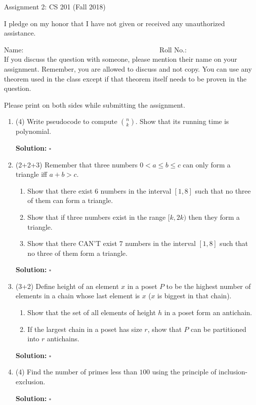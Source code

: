 \documentclass[10pt]{letter}
\newenvironment{solution}{\textbf{Solution:}}{\hfill$\square$}
\begin{document}
\begin{center}
Assignment 2: CS 201 (Fall 2018)
\end{center}

I pledge on my honor that I have not given or received any unauthorized assistance.

Name:        ~~~~~~~~~~~~~~~~~~~~~~~~~~~~~~~~~~~~~~   Roll No.:       \\

If you discuss the question with someone, please mention their name on your assignment. Remember, you are allowed to discuss and not copy.
You can use any theorem used in the class except if that theorem itself needs to be proven in the question.

Please print on both sides while submitting the assignment.

\begin{enumerate}

\item (4) Write pseudocode to compute $\binom{n}{k}$. Show that its running time is polynomial.

\begin{solution}
\end{solution}

\item (2+2+3) Remember that three numbers $0 < a\leq b\leq c$ can only form a triangle iff $a+b>c$. 
\begin{enumerate}
\item Show that there exist $6$ numbers in the interval $[1,8]$ such that no three of them can form a triangle.
\item Show that if three numbers exist in the range $[k,2k)$ then they form a triangle.
\item Show that there CAN'T exist $7$ numbers in the interval $[1,8]$ such that no three of them form a triangle.
\end{enumerate} 

\begin{solution}
\end{solution}


\item (3+2) Define height of an element $x$ in a poset $P$ to be the highest number of elements in a chain whose last element is $x$ ($x$ is biggest in that chain).
\begin{enumerate}
\item Show that the set of all elements of height $h$ in a poset form an antichain.
\item If the largest chain in a poset has size $r$, show that $P$ can be partitioned into $r$ antichains.
\end{enumerate}  

\begin{solution}
\end{solution}


\item (4) Find the number of primes less than $100$ using the principle of inclusion-exclusion.

\begin{solution}
\end{solution}


\end{enumerate}
\end{document}
